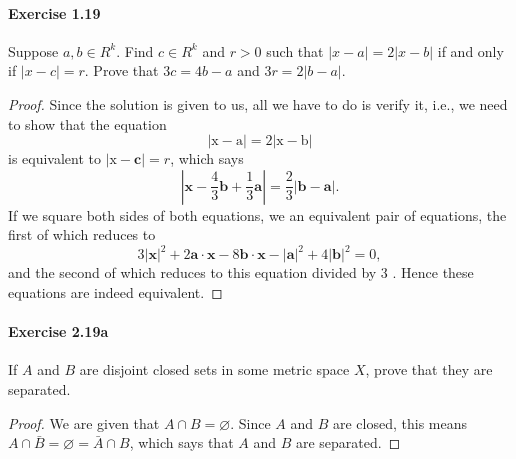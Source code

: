 \documentclass{article}
\theoremstyle{definition}
\begin{document}
\paragraph{Exercise 1.19} Suppose $a, b \in R^k$. Find $c \in R^k$ and $r > 0$ such that $|x-a|=2|x-b|$ if and only if $| x - c | = r$. Prove that $3c = 4b - a$ and $3r = 2 |b - a|$.
\begin{proof}
    Since the solution is given to us, all we have to do is verify it, i.e., we need to show that the equation
$$
|\mathrm{x}-\mathrm{a}|=2|\mathrm{x}-\mathrm{b}|
$$
is equivalent to $|\mathrm{x}-\mathbf{c}|=r$, which says
$$
\left|\mathbf{x}-\frac{4}{3} \mathbf{b}+\frac{1}{3} \mathbf{a}\right|=\frac{2}{3}|\mathbf{b}-\mathbf{a}| .
$$
If we square both sides of both equations, we an equivalent pair of equations, the first of which reduces to
$$
3|\mathbf{x}|^2+2 \mathbf{a} \cdot \mathbf{x}-8 \mathbf{b} \cdot \mathbf{x}-|\mathbf{a}|^2+4|\mathbf{b}|^2=0,
$$
and the second of which reduces to this equation divided by 3 . Hence these equations are indeed equivalent.
\end{proof}



\paragraph{Exercise 2.19a} If $A$ and $B$ are disjoint closed sets in some metric space $X$, prove that they are separated.
\begin{proof}
    We are given that $A \cap B=\varnothing$. Since $A$ and $B$ are closed, this means $A \cap \bar{B}=\varnothing=\bar{A} \cap B$, which says that $A$ and $B$ are separated.
\end{proof}
\end{document}
